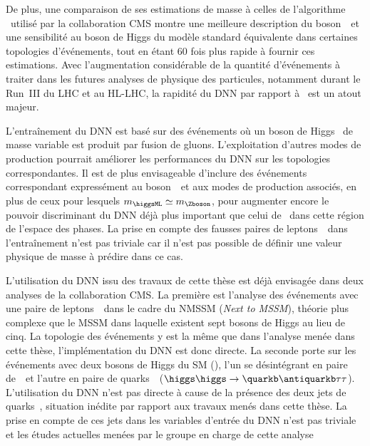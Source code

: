 De plus,
une comparaison de ses estimations de masse à celles de l'algorithme \SVFIT\ utilisé par la collaboration CMS montre
une meilleure description du boson~\Zboson\ et une sensibilité au boson de Higgs du modèle standard
équivalente
dans certaines topologies d'événements,
tout en étant 60 fois plus rapide à fournir ces estimations.
Avec l'augmentation considérable de la quantité d'événements à traiter
dans les futures analyses de physique des particules,
notamment durant le Run~III du LHC et au HL-LHC,
la rapidité du DNN par rapport à \SVFIT\
est un atout majeur.
\par
L'entraînement du DNN est basé sur des événements
où un boson de Higgs \higgsML\ de masse variable est produit par fusion de gluons.
L'exploitation d'autres modes de production
pourrait améliorer les performances
du DNN sur les topologies correspondantes.
Il est de plus envisageable d'inclure
des événements correspondant expressément au boson~\Zboson\
et aux modes de production associés,
en plus de ceux pour lesquels $m_{\higgsML}\simeq m_{\Zboson}$,
pour augmenter encore le pouvoir discriminant du DNN
déjà plus important que celui de \mTtot\
dans cette région de l'espace des phases.
La prise en compte des fausses paires de leptons~\tau\
dans l'entraînement
n'est pas triviale
car il n'est pas possible de définir une valeur physique de masse à prédire
dans ce cas.
\par
L'utilisation du DNN issu des travaux de cette thèse
est déjà envisagée dans deux analyses de la collaboration CMS.
La première est l'analyse des événements avec une paire de leptons~\tau\
dans le cadre du NMSSM (\emph{Next to MSSM}),
théorie plus complexe que le MSSM dans laquelle existent sept bosons de Higgs au lieu de cinq.
La topologie des événements y est la même que dans l'analyse menée dans cette thèse,
l'implémentation du DNN est donc directe.
La seconde porte sur les événements avec deux bosons de Higgs du SM (\higgs),
l'un se désintégrant en paire de~\tau\
et l'autre en paire de quarks~\quarkb\
($\higgs\higgs\to\quarkb\antiquarkb\tau\tau$).
L'utilisation du DNN n'est pas directe à cause de la présence des deux jets de quarks~\quarkb,
situation inédite par rapport aux travaux menés dans cette thèse.
La prise en compte de ces jets dans les variables d'entrée du DNN n'est pas triviale
et
les études actuelles menées par le groupe en charge de cette analyse
